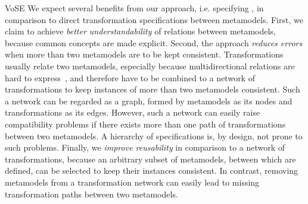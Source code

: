 \begin{copiedFrom}{VoSE}
We expect several benefits from our approach, i.e. specifying \commonalities, in comparison to direct transformation specifications between metamodels.
First, we claim to achieve \emph{better understandability} of relations between metamodels, because common concepts are made explicit. %
Second, the approach \emph{reduces errors} when more than two metamodels are to be kept consistent.
Transformations usually relate two metamodels, especially because multidirectional relations are hard to express~\cite{stevens2017a},
and therefore have to be combined to a network of transformations to keep instances of more than two metamodels consistent.
Such a network can be regarded as a graph, formed by metamodels as its nodes and transformations as its edges.
However, such a network can easily raise compatibility problems if there exists more than one path of transformations between two metamodels.
A hierarchy of \commonality specifications is, by design, not prone to such problems.
Finally, we \emph{improve reusability} in comparison to a network of transformations, %
because an arbitrary subset of metamodels, between which \commonalities are defined, can be selected to keep their instances consistent.
In contrast, removing metamodels from a transformation network can easily lead to missing transformation paths between two metamodels.


\end{copiedFrom} %


